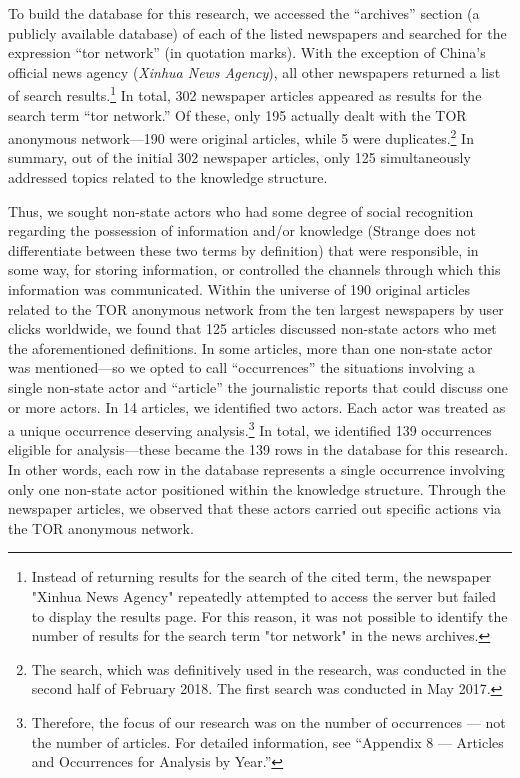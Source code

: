 To build the database for this research, we accessed the “archives” section (a publicly available database) of each of the listed newspapers and searched for the expression “tor network” (in quotation marks). With the exception of China's official news agency (\textit{Xinhua News Agency}), all other newspapers returned a list of search results.\footnote{Instead of returning results for the search of the cited term, the newspaper "Xinhua News Agency" repeatedly attempted to access the server but failed to display the results page. For this reason, it was not possible to identify the number of results for the search term "tor network" in the news archives.} In total, 302 newspaper articles appeared as results for the search term “tor network.” Of these, only 195 actually dealt with the TOR anonymous network—190 were original articles, while 5 were duplicates.\footnote{The search, which was definitively used in the research, was conducted in the second half of February 2018. The first search was conducted in May 2017.} In summary, out of the initial 302 newspaper articles, only 125 simultaneously addressed topics related to the knowledge structure.

Thus, we sought non-state actors who had some degree of social recognition regarding the possession of information and/or knowledge (Strange does not differentiate between these two terms by definition) that were responsible, in some way, for storing information, or controlled the channels through which this information was communicated. Within the universe of 190 original articles related to the TOR anonymous network from the ten largest newspapers by user clicks worldwide, we found that 125 articles discussed non-state actors who met the aforementioned definitions. In some articles, more than one non-state actor was mentioned—so we opted to call “occurrences” the situations involving a single non-state actor and “article” the journalistic reports that could discuss one or more actors. In 14 articles, we identified two actors. Each actor was treated as a unique occurrence deserving analysis.\footnote{Therefore, the focus of our research was on the number of occurrences — not the number of articles. For detailed information, see “Appendix 8 — Articles and Occurrences for Analysis by Year.”} In total, we identified 139 occurrences eligible for analysis—these became the 139 rows in the database for this research. In other words, each row in the database represents a single occurrence involving only one non-state actor positioned within the knowledge structure. Through the newspaper articles, we observed that these actors carried out specific actions via the TOR anonymous network.

